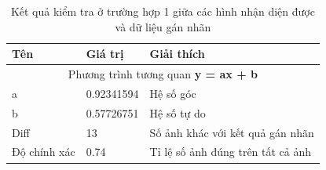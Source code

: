 \begin{table}[H]
    \begin{tabular}{p{4cm}  p{2.5cm}  p{5.5cm} }   
    \hline		
	Tên & Giá trị & Giải thích \\
	\hline
	\multicolumn{3}{c}{Phương trình tương quan \textbf{y = ax + b}} \\
	a & 0.92341594 & Hệ số góc \\
	b & 0.57726751 & Hệ số tự do \\
	\hline	
	Diff & 13 & Số ảnh khác với kết quả gán nhãn \\
	Độ chính xác & 0.74 &  Tỉ lệ số ảnh đúng trên tất cả ảnh\\
	\hline
	\end{tabular}
	\caption{Kết quả kiểm tra ở trường hợp 1 giữa các hình nhận diện được và dữ liệu gán nhãn}
    \label{chap3:case2:table02}    
\end{table}
